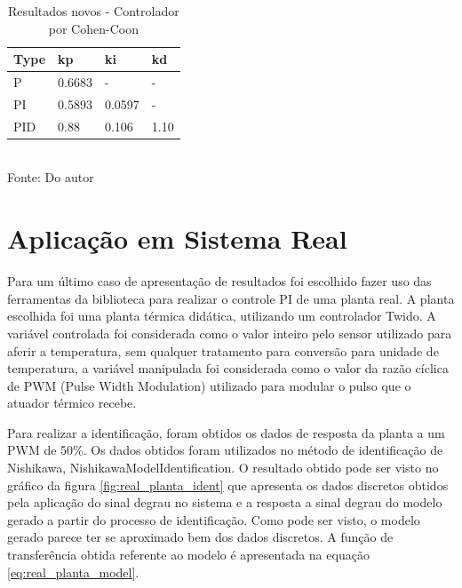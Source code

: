 \begin{table}[H]
    \caption{Resultados novos - Controlador por Cohen-Coon}
    \centering
    \begin{tabular}{|l|l|l|l|}
        \hline
        \textbf{Type} & \textbf{kp} & \textbf{ki} & \textbf{kd} \\
        \hline
        P             & 0.6683      & -           & -           \\
        \hline
        PI            & 0.5893      & 0.0597      & -           \\
        \hline
        PID           & 0.88        & 0.106       & 1.10        \\
        \hline
    \end{tabular}
    \label{tab:comp_nw_cc}
    \\
    \vspace{0cm}\hspace{0cm}\small{Fonte: Do autor}
\end{table}


\section{Aplicação em Sistema Real}

Para um último caso de apresentação de resultados foi escolhido fazer uso das ferramentas da biblioteca para
realizar o controle PI de uma planta real.
A planta escolhida foi uma planta térmica didática, utilizando um controlador Twido.
A variável controlada foi considerada como o valor inteiro pelo sensor utilizado para aferir a temperatura, sem
qualquer tratamento para conversão para unidade de temperatura, a variável manipulada foi considerada como o valor da
razão cíclica de PWM (Pulse Width Modulation) utilizado para modular o pulso que o atuador térmico recebe.

Para realizar a identificação, foram obtidos os dados de resposta da planta a um PWM de 50\%.
Os dados obtidos foram utilizados no método de identificação de Nishikawa, NishikawaModelIdentification.
O resultado obtido pode ser visto no gráfico da figura \ref{fig:real_planta_ident} que apresenta os dados discretos
obtidos pela aplicação do sinal degrau no sistema e a resposta a sinal degrau do modelo gerado a partir do processo de
identificação.
Como pode ser visto, o modelo gerado parece ter se aproximado bem dos dados discretos.
A função de transferência obtida referente ao modelo é apresentada na equação \eqref{eq:real_planta_model}.


